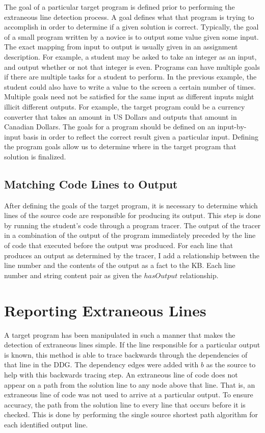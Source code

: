 The goal of a particular target program is defined prior to performing the extraneous line detection process. A goal defines what that program is trying to accomplish in order to determine if a given solution is correct. Typically, the goal of a small program written by a novice is to output some value given some input. The exact mapping from input to output is usually given in an assignment description. For example, a student may be asked to take an integer as an input, and output whether or not that integer is even. Programs can have multiple goals if there are multiple tasks for a student to perform. In the previous example, the student could also have to write a value to the screen a certain number of times. Multiple goals need not be satisfied for the same input as different inputs might illicit different outputs. For example, the target program could be a currency converter that takes an amount in US Dollars and outputs that amount in Canadian Dollars. The goals for a program should be defined on an input-by-input basis in order to reflect the correct result given a particular input. Defining the program goals allow us to determine where in the target program that solution is finalized.

\subsection{Matching Code Lines to Output}
After defining the goals of the target program, it is necessary to determine which lines of the source code are responsible for producing its output. This step is done by running the student's code through a program tracer. The output of the tracer in a combination of the output of the program immediately preceded by the line of code that executed before the output was produced. For each line that produces an output as determined by the tracer, I add a relationship between the line number and the contents of the output as a fact to the KB. Each line number and string content pair as given the $hasOutput$ relationship.

\section{Reporting Extraneous Lines}
A target program has been manipulated in such a manner that makes the detection of extraneous lines simple. If the line responsible for a particular output is known, this method is able to trace backwards through the dependencies of that line in the DDG. The dependency edges were added with $b$ as the source to help with this backwards tracing step. An extraneous line of code does not appear on a path from the solution line to any node above that line. That is, an extraneous line of code was not used to arrive at a particular output. To ensure accuracy, the path from the solution line to every line that occurs before it is checked. This is done by performing the single source shortest path algorithm for each identified output line.
